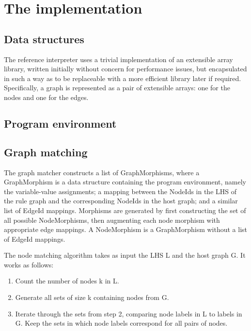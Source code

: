 



\section{The implementation}


\subsection{Data structures}

The reference interpreter uses a trivial implementation of an extensible array library, written initially without concern for performance issues, but encapsulated in such a way as to be replaceable with a more efficient library later if required. Specifically, a graph is represented as a pair of extensible arrays: one for the nodes and one for the edges.

\subsection{Program environment}

\subsection{Graph matching}

The graph matcher constructs a list of GraphMorphisms, where a GraphMorphism is a data structure containing the program environment, namely the variable-value assignments; a mapping between the NodeIds in the LHS of the rule graph and the corresponding NodeIds in the host graph; and a similar list of EdgeId mappings. Morphisms are generated by first constructing the set of all possible NodeMorphisms, then augmenting each node morphism with appropriate edge mappings. A NodeMorphism is a GraphMorphism without a list of EdgeId mappings.


The node matching algorithm takes as input the LHS L and the host graph G. It works as follows:

\begin{enumerate}
	\item Count the number of nodes k in L.
	\item Generate all sets of size k containing nodes from G.
	\item Iterate through the sets from step 2, comparing node labels in L to labels in G. Keep the sets in which node labels correspond for all pairs of nodes.
\end{enumerate}

